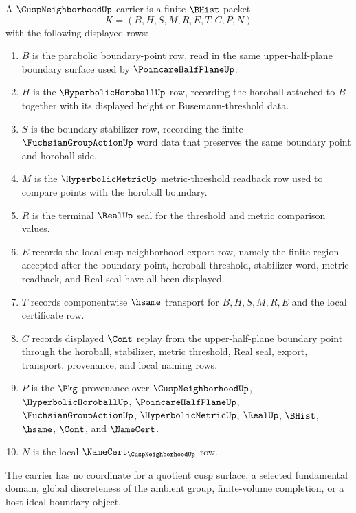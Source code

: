 \begin{definition}
\label{def:cusp-neighborhood-carrier}
A $\CuspNeighborhoodUp$ carrier is a finite $\BHist$ packet
$$
K=(B,H,S,M,R,E,T,C,P,N)
$$
with the following displayed rows:
\begin{enumerate}
\item $B$ is the parabolic boundary-point row, read in the same upper-half-plane boundary surface used by $\PoincareHalfPlaneUp$.
\item $H$ is the $\HyperbolicHoroballUp$ row, recording the horoball attached to $B$ together with its displayed height or Busemann-threshold data.
\item $S$ is the boundary-stabilizer row, recording the finite $\FuchsianGroupActionUp$ word data that preserves the same boundary point and horoball side.
\item $M$ is the $\HyperbolicMetricUp$ metric-threshold readback row used to compare points with the horoball boundary.
\item $R$ is the terminal $\RealUp$ seal for the threshold and metric comparison values.
\item $E$ records the local cusp-neighborhood export row, namely the finite region accepted after the boundary point, horoball threshold, stabilizer word, metric readback, and Real seal have all been displayed.
\item $T$ records componentwise $\hsame$ transport for $B,H,S,M,R,E$ and the local certificate row.
\item $C$ records displayed $\Cont$ replay from the upper-half-plane boundary point through the horoball, stabilizer, metric threshold, Real seal, export, transport, provenance, and local naming rows.
\item $P$ is the $\Pkg$ provenance over $\CuspNeighborhoodUp$, $\HyperbolicHoroballUp$, $\PoincareHalfPlaneUp$, $\FuchsianGroupActionUp$, $\HyperbolicMetricUp$, $\RealUp$, $\BHist$, $\hsame$, $\Cont$, and $\NameCert$.
\item $N$ is the local $\NameCert_{\CuspNeighborhoodUp}$ row.
\end{enumerate}
The carrier has no coordinate for a quotient cusp surface, a selected fundamental domain, global discreteness of the ambient group, finite-volume completion, or a host ideal-boundary object.
\end{definition}

